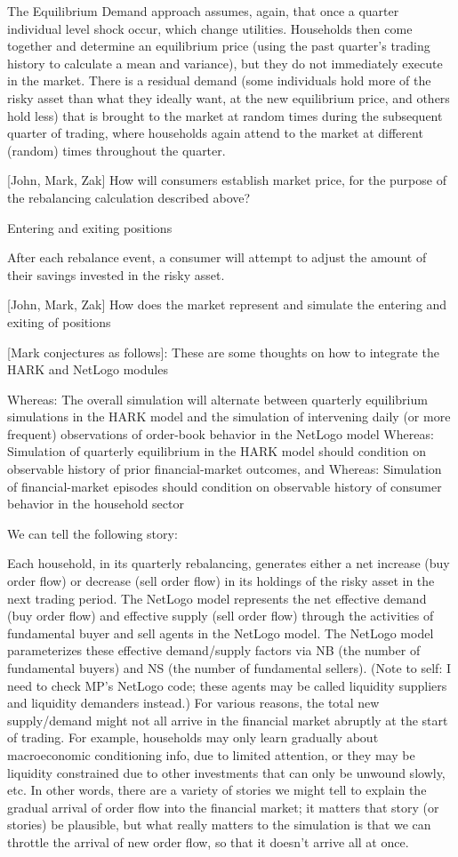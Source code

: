 The Equilibrium Demand approach assumes, again, that once a quarter individual
level shock occur, which change utilities. Households then come together and
determine an equilibrium price (using the past quarter’s trading history to
calculate a mean and variance), but they do not immediately execute in the
market. There is a residual demand (some individuals hold more of the risky
asset than what they ideally want, at the new equilibrium price, and others
hold less) that is brought to the market at random times during the
subsequent quarter of trading, where households again attend to the market
at different (random) times throughout the quarter.

[John, Mark, Zak] How will consumers establish market price, for the purpose
of the rebalancing calculation described above?

Entering and exiting positions

After each rebalance event, a consumer will attempt to adjust the amount of
their savings invested in the risky asset. 

[John, Mark, Zak] How does the market represent and simulate the entering
and exiting of positions

[Mark conjectures as follows]: 
These are some thoughts on how to integrate the HARK and NetLogo modules

Whereas: The overall simulation will alternate between quarterly equilibrium
simulations in the HARK model and the simulation of intervening daily (or
more frequent) observations of order-book behavior in the NetLogo model
Whereas: Simulation of quarterly equilibrium in the HARK model should
condition on observable history of prior financial-market outcomes, and
Whereas: Simulation of financial-market episodes should condition on
observable history of consumer behavior in the household sector

We can tell the following story:

Each household, in its quarterly rebalancing, generates either a net increase
(buy order flow) or decrease (sell order flow) in its holdings of the risky
asset in the next trading period. The NetLogo model represents the net
effective demand (buy order flow) and effective supply (sell order flow)
through the activities of fundamental buyer and sell agents in the NetLogo
model. The NetLogo model parameterizes these effective demand/supply factors
via NB (the number of fundamental buyers) and NS (the number of fundamental
sellers). (Note to self: I need to check MP’s NetLogo code; these agents
may be called liquidity suppliers and liquidity demanders instead.) For
various reasons, the total new supply/demand might not all arrive in the
financial market abruptly at the start of trading. For example, households
may only learn gradually about macroeconomic conditioning info, due to
limited attention, or they may be liquidity constrained due to other
investments that can only be unwound slowly, etc. In other words,
there are a variety of stories we might tell to explain the gradual
arrival of order flow into the financial market; it matters that story
(or stories) be plausible, but what really matters to the simulation
is that we can throttle the arrival of new order flow, so that it
doesn’t arrive all at once.


